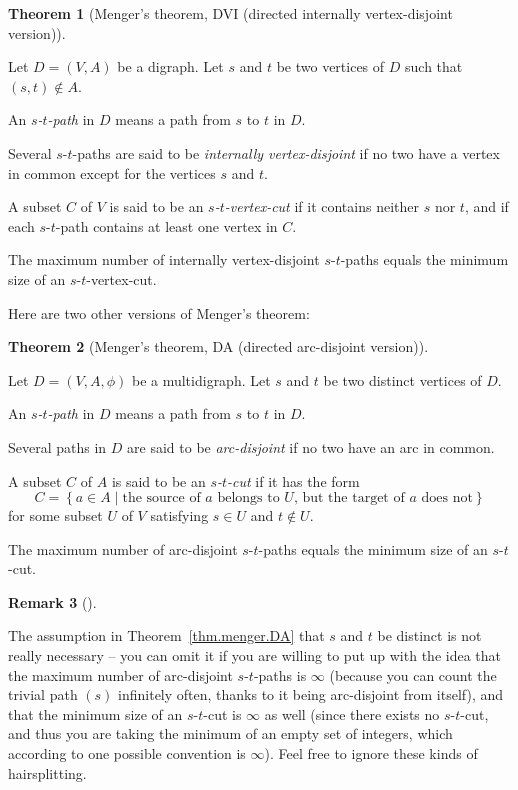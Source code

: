 \documentclass[numbers=enddot,12pt,final,onecolumn,notitlepage]{scrartcl}%
\theoremstyle{definition}
\newtheorem{theo}{Theorem}[section]
\newenvironment{theorem}[1][]
{\begin{theo}[#1]\begin{leftbar}}
{\end{leftbar}\end{theo}}
\newtheorem{remk}[theo]{Remark}
\newenvironment{remark}[1][]
{\begin{remk}[#1]\begin{leftbar}}
{\end{leftbar}\end{remk}}
\newcommand{\set}[1]{\left\{ #1 \right\}}
\newcommand{\tup}[1]{\left( #1 \right)}
\begin{document}
\begin{theorem}[Menger's theorem, DVI (directed internally
vertex-disjoint version)] \label{thm.menger.DVI}
Let $D = \tup{V, A}$ be a digraph.
Let $s$ and $t$ be two vertices of $D$ such that
$\tup{s, t} \notin A$.

An \textit{$s$-$t$-path} in $D$ means a path from $s$ to $t$ in $D$.

Several $s$-$t$-paths are said to be
\textit{internally vertex-disjoint} if no two have a vertex in common
except for the vertices $s$ and $t$.

A subset $C$ of $V$ is said to be an \textit{$s$-$t$-vertex-cut} if it
contains neither $s$ nor $t$, and if
each $s$-$t$-path contains at least one vertex in $C$.

The maximum number of internally vertex-disjoint $s$-$t$-paths equals
the minimum size of an $s$-$t$-vertex-cut.
\end{theorem}

Here are two other versions of Menger's theorem:

\begin{theorem}[Menger's theorem, DA (directed arc-disjoint
version)] \label{thm.menger.DA}
Let $D = \tup{V, A, \phi}$ be a multidigraph.
Let $s$ and $t$ be two distinct vertices of $D$.

An \textit{$s$-$t$-path} in $D$ means a path from $s$ to $t$ in $D$.

Several paths in $D$ are said to be
\textit{arc-disjoint} if no two have an arc in common.

A subset $C$ of $A$ is said to be an \textit{$s$-$t$-cut} if it has
the form
\[
C = \set{ a \in A \mid \text{the source of } a \text{ belongs to } U
                        \text{, but the target of } a \text{ does not}
        }
\]
for some subset $U$ of $V$ satisfying $s \in U$ and $t \notin U$.

The maximum number of arc-disjoint $s$-$t$-paths equals
the minimum size of an $s$-$t$-cut.
\end{theorem}

\begin{remark}
The assumption in Theorem~\ref{thm.menger.DA} that $s$ and $t$ be
distinct is not really necessary -- you can omit it if you are willing
to put up with the idea that the maximum number of arc-disjoint
$s$-$t$-paths is $\infty$ (because you can count the trivial
path $\tup{s}$ infinitely often, thanks to it being arc-disjoint from
itself), and that the minimum size of an $s$-$t$-cut is $\infty$ as
well (since there exists no $s$-$t$-cut, and thus you are taking the
minimum of an empty set of integers, which according to one possible
convention is $\infty$).
Feel free to ignore these kinds of hairsplitting.
\end{remark}
\end{document}

